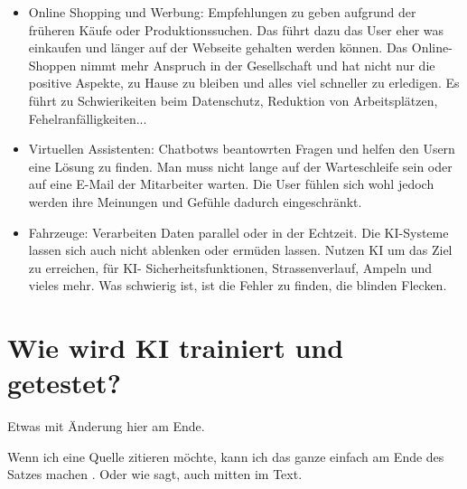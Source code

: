 \documentclass{report}
\begin{document}
\begin{itemize}
    \item Online Shopping und Werbung: Empfehlungen zu geben aufgrund der früheren Käufe oder Produktionssuchen.
    Das führt dazu das User eher was einkaufen und länger auf der Webseite gehalten werden können. Das Online-Shoppen nimmt mehr Anspruch in der Gesellschaft und hat nicht nur die positive Aspekte, zu Hause zu bleiben und alles viel schneller zu erledigen.
    Es führt zu Schwierikeiten beim Datenschutz, Reduktion von Arbeitsplätzen, Fehelranfälligkeiten... 
    \item Virtuellen Assistenten: Chatbotws beantowrten Fragen und helfen den Usern eine Lösung zu finden. Man muss nicht lange auf der Warteschleife sein oder auf eine E-Mail der Mitarbeiter warten.
    Die User fühlen sich wohl jedoch werden ihre Meinungen und Gefühle dadurch eingeschränkt.
    \item Fahrzeuge: Verarbeiten Daten parallel oder in der Echtzeit. Die KI-Systeme lassen sich auch nicht ablenken oder ermüden lassen. Nutzen KI um das Ziel zu erreichen, für KI- Sicherheitsfunktionen, Strassenverlauf, Ampeln und vieles mehr.
    Was schwierig ist, ist die Fehler zu finden, die blinden Flecken. 
   
\end{itemize}





\section{Wie wird KI trainiert und getestet?}

Etwas mit Änderung hier am Ende.

Wenn ich eine Quelle zitieren möchte, kann ich das ganze einfach am Ende des Satzes machen \citep{example}. Oder wie \citet{example} sagt, auch mitten im Text.

\printbibliography
\end{document}
